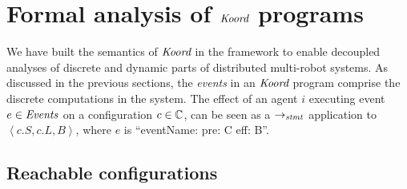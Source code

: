 \section{Formal analysis of $\emph{Koord}$ programs}
\label{sec:verification}
We have built the semantics of $\emph{Koord}$  in the \K framework to enable decoupled analyses of discrete and dynamic parts of distributed multi-robot systems. As discussed in the previous sections, the \emph{events} in an $\emph{Koord}$ program comprise the discrete computations in the system. The effect of an agent $i$ executing event $e\in \mathit{Events}$ on a configuration $c\in \mathbb{C}$, can be seen as a $\rightarrow_\mathit{stmt}$ application to  $\left\langle c.S, c.L, B \right\rangle $, where $e$ is ``eventName: pre: C eff: B''.

\subsection{Reachable configurations}


